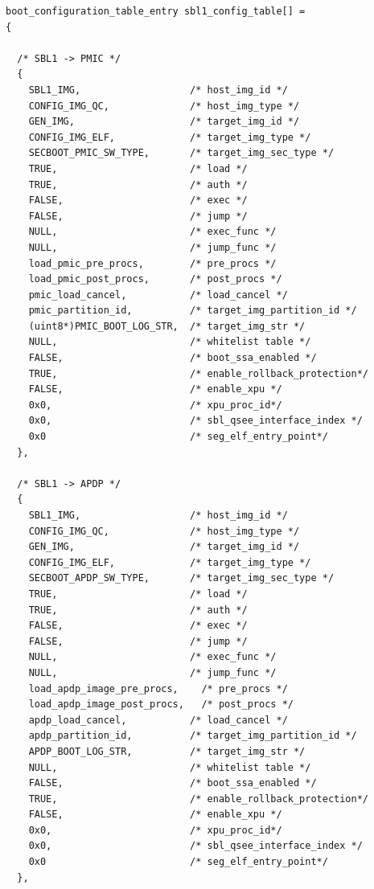 \begin{lstlisting}
boot_configuration_table_entry sbl1_config_table[] = 
{

  /* SBL1 -> PMIC */
  {
    SBL1_IMG,                   /* host_img_id */
    CONFIG_IMG_QC,              /* host_img_type */
    GEN_IMG,                    /* target_img_id */
    CONFIG_IMG_ELF,             /* target_img_type */
    SECBOOT_PMIC_SW_TYPE,       /* target_img_sec_type */ 
    TRUE,                       /* load */
    TRUE,                       /* auth */
    FALSE,                      /* exec */
    FALSE,                      /* jump */
    NULL,                       /* exec_func */
    NULL,                       /* jump_func */
    load_pmic_pre_procs,        /* pre_procs */ 
    load_pmic_post_procs,       /* post_procs */
    pmic_load_cancel,           /* load_cancel */
    pmic_partition_id,          /* target_img_partition_id */
    (uint8*)PMIC_BOOT_LOG_STR,  /* target_img_str */
    NULL,                       /* whitelist table */
    FALSE,                      /* boot_ssa_enabled */
    TRUE,                       /* enable_rollback_protection*/
    FALSE,                      /* enable_xpu */
    0x0,                        /* xpu_proc_id*/    
    0x0,                        /* sbl_qsee_interface_index */
    0x0                         /* seg_elf_entry_point*/
  },

  /* SBL1 -> APDP */
  {
    SBL1_IMG,                   /* host_img_id */
    CONFIG_IMG_QC,              /* host_img_type */
    GEN_IMG,                    /* target_img_id */
    CONFIG_IMG_ELF,             /* target_img_type */
    SECBOOT_APDP_SW_TYPE,       /* target_img_sec_type */ 
    TRUE,                       /* load */
    TRUE,                       /* auth */
    FALSE,                      /* exec */
    FALSE,                      /* jump */
    NULL,                       /* exec_func */
    NULL,                       /* jump_func */
    load_apdp_image_pre_procs,    /* pre_procs */ 
    load_apdp_image_post_procs,   /* post_procs */
    apdp_load_cancel,           /* load_cancel */
    apdp_partition_id,          /* target_img_partition_id */
    APDP_BOOT_LOG_STR,          /* target_img_str */
    NULL,                       /* whitelist table */
    FALSE,                      /* boot_ssa_enabled */
    TRUE,                       /* enable_rollback_protection*/
    FALSE,                      /* enable_xpu */
    0x0,                        /* xpu_proc_id*/    
    0x0,                        /* sbl_qsee_interface_index */
    0x0                         /* seg_elf_entry_point*/
  },


\end{lstlisting}
